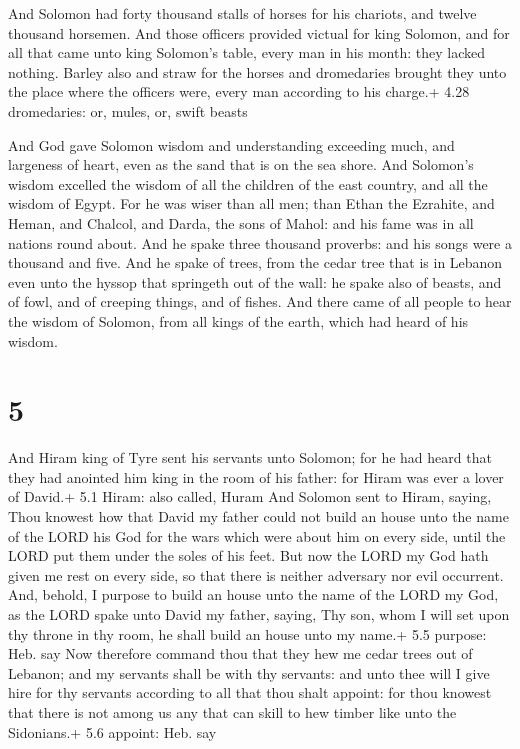  And Solomon had forty thousand stalls of horses for his
chariots, and twelve thousand horsemen.  And those officers
provided victual for king Solomon, and for all that came unto king
Solomon's table, every man in his month: they lacked nothing.
 Barley also and straw for the horses and dromedaries
brought they unto the place where the officers were, every man according
to his charge.+ 4.28 dromedaries: or, mules, or, swift beasts

 And God gave Solomon wisdom and understanding exceeding
much, and largeness of heart, even as the sand that is on the sea shore.
 And Solomon's wisdom excelled the wisdom of all the
children of the east country, and all the wisdom of Egypt. 
For he was wiser than all men; than Ethan the Ezrahite, and Heman, and
Chalcol, and Darda, the sons of Mahol: and his fame was in all nations
round about.  And he spake three thousand proverbs: and his
songs were a thousand and five.  And he spake of trees,
from the cedar tree that is in Lebanon even unto the hyssop that
springeth out of the wall: he spake also of beasts, and of fowl, and of
creeping things, and of fishes.  And there came of all
people to hear the wisdom of Solomon, from all kings of the earth, which
had heard of his wisdom.

\hypertarget{section-4}{%
\section{5}\label{section-4}}

 And Hiram king of Tyre sent his servants unto Solomon; for
he had heard that they had anointed him king in the room of his father:
for Hiram was ever a lover of David.+ 5.1 Hiram: also called, Huram
 And Solomon sent to Hiram, saying,  Thou
knowest how that David my father could not build an house unto the name
of the LORD his God for the wars which were about him on every side,
until the LORD put them under the soles of his feet.  But
now the LORD my God hath given me rest on every side, so that there is
neither adversary nor evil occurrent.  And, behold, I
purpose to build an house unto the name of the LORD my God, as the LORD
spake unto David my father, saying, Thy son, whom I will set upon thy
throne in thy room, he shall build an house unto my name.+ 5.5 purpose:
Heb. say  Now therefore command thou that they hew me cedar
trees out of Lebanon; and my servants shall be with thy servants: and
unto thee will I give hire for thy servants according to all that thou
shalt appoint: for thou knowest that there is not among us any that can
skill to hew timber like unto the Sidonians.+ 5.6 appoint: Heb. say

